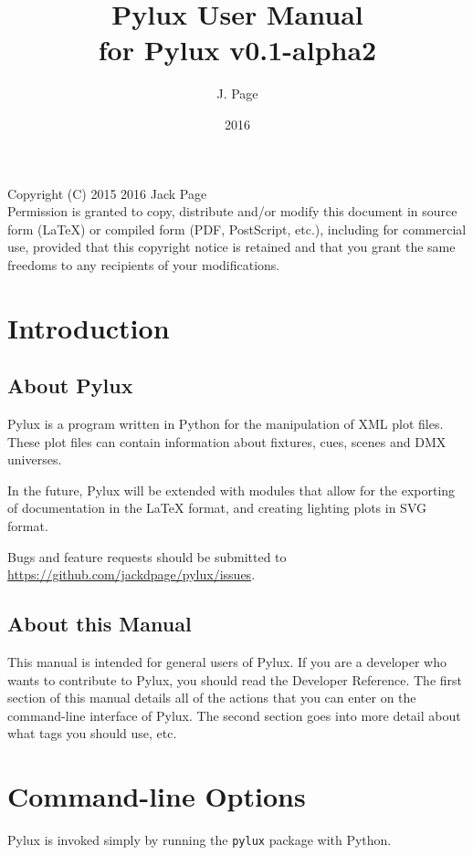 \documentclass[a4paper]{article}
\begin{document}
\title{Pylux User Manual \\ \large{for Pylux v0.1-alpha2}}
\author{J. Page}
\date{2016}
\maketitle
\vspace{1.0pt}
Copyright (C)  2015 2016 Jack Page \\
Permission is granted to copy, distribute and/or modify this document
in source form (LaTeX) or compiled form (PDF, PostScript, etc.), including 
for commercial use, provided that this copyright notice is retained and that 
you grant the same freedoms to any recipients of your modifications.
\tableofcontents
\newpage
\section{Introduction}
\subsection{About Pylux}
Pylux is a program written in Python for the manipulation of XML plot files. 
These plot files can contain information about fixtures, cues, scenes and DMX 
universes. 

In the future, Pylux will be extended with modules that allow for the exporting
of documentation in the \LaTeX{} format, and creating lighting plots in SVG 
format.

Bugs and feature requests should be submitted to 
\url{https://github.com/jackdpage/pylux/issues}.

\subsection{About this Manual}
This manual is intended for general users of Pylux. If you are a developer 
who wants to contribute to Pylux, you should read the Developer Reference. 
The first section of this manual details all of the actions that you can enter 
on the command-line interface of Pylux. The second section goes into more 
detail about what tags you should use, etc.

\section{Command-line Options}
Pylux is invoked simply by running the \texttt{pylux} package with Python. 
\end{document}
